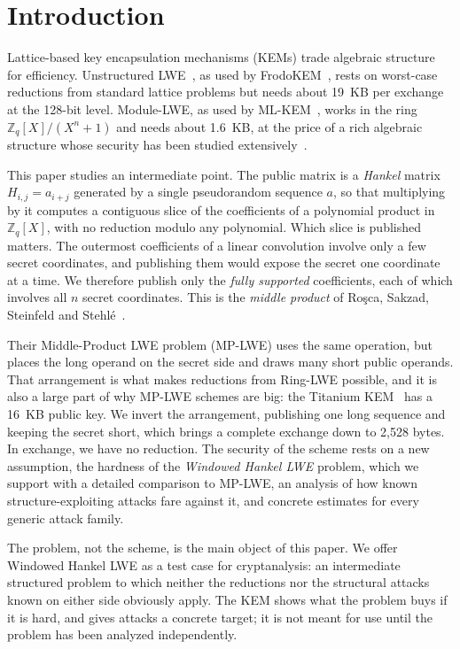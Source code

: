 \documentclass[11pt,a4paper]{article}
\theoremstyle{definition}
\newcommand{\Zq}{\mathbb{Z}_q}
\begin{document}
\section{Introduction}

Lattice-based key encapsulation mechanisms (KEMs) trade algebraic structure for efficiency. Unstructured LWE~\cite{regev2009lattices}, as used by FrodoKEM~\cite{bos2016frodo}, rests on worst-case reductions from standard lattice problems but needs about 19~KB per exchange at the 128-bit level. Module-LWE, as used by ML-KEM~\cite{fips203,bos2018kyber}, works in the ring $\Zq[X]/(X^{n}+1)$ and needs about 1.6~KB, at the price of a rich algebraic structure whose security has been studied extensively~\cite{peikert2016decade}.

This paper studies an intermediate point. The public matrix is a \emph{Hankel} matrix $H_{i,j} = a_{i+j}$ generated by a single pseudorandom sequence $a$, so that multiplying by it computes a contiguous slice of the coefficients of a polynomial product in $\Zq[X]$, with no reduction modulo any polynomial. Which slice is published matters. The outermost coefficients of a linear convolution involve only a few secret coordinates, and publishing them would expose the secret one coordinate at a time. We therefore publish only the \emph{fully supported} coefficients, each of which involves all $n$ secret coordinates. This is the \emph{middle product} of Ro\c{s}ca, Sakzad, Steinfeld and Stehl\'e~\cite{rsss2017middle}.

Their Middle-Product LWE problem (MP-LWE) uses the same operation, but places the long operand on the secret side and draws many short public operands. That arrangement is what makes reductions from Ring-LWE possible, and it is also a large part of why MP-LWE schemes are big: the Titanium KEM~\cite{titanium2017nist,ssz2019practical} has a 16~KB public key. We invert the arrangement, publishing one long sequence and keeping the secret short, which brings a complete exchange down to 2{,}528 bytes. In exchange, we have no reduction. The security of the scheme rests on a new assumption, the hardness of the \emph{Windowed Hankel LWE} problem, which we support with a detailed comparison to MP-LWE, an analysis of how known structure-exploiting attacks fare against it, and concrete estimates for every generic attack family.

The problem, not the scheme, is the main object of this paper. We offer Windowed Hankel LWE as a test case for cryptanalysis: an intermediate structured problem to which neither the reductions nor the structural attacks known on either side obviously apply. The KEM shows what the problem buys if it is hard, and gives attacks a concrete target; it is not meant for use until the problem has been analyzed independently.
\end{document}
